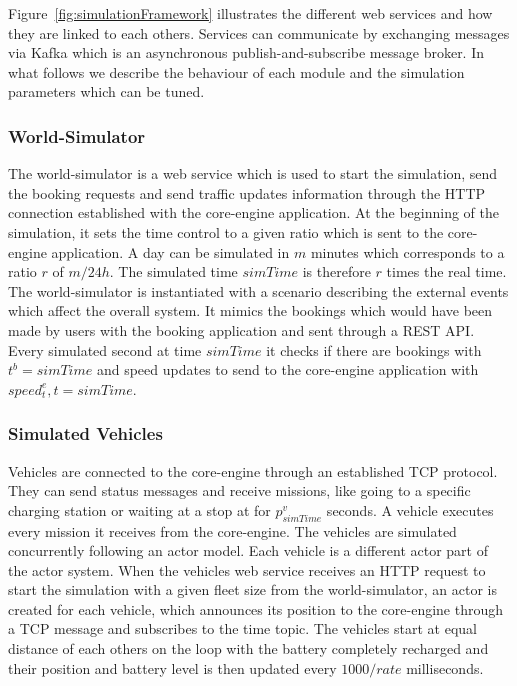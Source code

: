 \documentclass[12pt,a4paper]{article}
\begin{document}
Figure~\ref{fig:simulationFramework} illustrates the different web services and how they are linked to each others. Services can communicate by exchanging messages via Kafka which is an asynchronous publish-and-subscribe message broker. In what follows we describe the behaviour of each module and the simulation parameters which can be tuned. 

\subsubsection{World-Simulator}
The world-simulator is a web service which is used to start the simulation, send the booking requests and send traffic updates information through the HTTP connection established with the core-engine application. At the beginning of the simulation, it sets the time control to a given ratio which is sent to the core-engine application.  A day can be simulated in $m$ minutes which corresponds to a ratio $r$ of $m / 24h$. The simulated time $simTime$ is therefore $r$ times the real time. The world-simulator is instantiated with a scenario describing the external events which affect the overall system. It mimics the bookings which would have been made by users with the booking application and sent through a REST API. Every simulated second at time $simTime$ it checks if there are bookings with $t^{b} = simTime$ and speed updates to send to the core-engine application with $speed_{t}^{e}, t = simTime$. 

\subsubsection{Simulated Vehicles}
Vehicles are connected to the core-engine through an established TCP protocol. They can send status messages and receive missions, like going to a specific charging station or waiting at a stop at for $p^{v}_{simTime}$ seconds. A vehicle executes every mission it receives from the core-engine. The vehicles are simulated concurrently following an actor model. Each vehicle is a different actor part of the actor system. When the vehicles web service receives an HTTP request to start the simulation with a given fleet size from the world-simulator, an actor is created for each vehicle, which announces its position to the core-engine through a TCP message and subscribes to the time topic. The vehicles start at equal distance of each others on the loop with the battery completely recharged and their position and battery level is then updated every $1000/rate$ milliseconds.  
\end{document}
